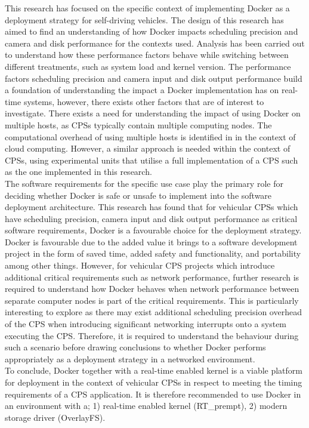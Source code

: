 This research has focused on the specific context of implementing Docker as a deployment strategy for self-driving vehicles. The design of this research has aimed to find an understanding of how Docker impacts scheduling precision and camera and disk performance for the contexts used. Analysis has been carried out to understand how these performance factors behave while switching between different treatments, such as system load and kernel version. The performance factors scheduling precision and camera input and disk output performance build a foundation of understanding the impact a Docker implementation has on real-time systems, however, there exists other factors that are of interest to investigate. There exists a need for understanding the impact of using Docker on multiple hosts, as CPSs typically contain multiple computing nodes. The computational overhead of using multiple hosts is identified in \cite{p1} in the context of cloud computing. However, a similar approach is needed within the context of CPSs, using experimental units that utilise a full implementation of a CPS such as the one implemented in this research.\\

The software requirements for the specific use case play the primary role for deciding whether Docker is safe or unsafe to implement into the software deployment architecture. This research has found that for vehicular CPSs which have scheduling precision, camera input and disk output performance as critical software requirements, Docker is a favourable choice for the deployment strategy. Docker is favourable due to the added value it brings to a software development project in the form of saved time, added safety and functionality, and portability among other things. However, for vehicular CPS projects which introduce additional critical requirements such as network performance, further research is required to understand how Docker behaves when network performance between separate computer nodes is part of the critical requirements. This is particularly interesting to explore as there may exist additional scheduling precision overhead of the CPS when introducing significant networking interrupts onto a system executing the CPS. Therefore, it is required to understand the behaviour during such a scenario before drawing conclusions to whether Docker performs appropriately as a deployment strategy in a networked environment.\\

To conclude, Docker together with a real-time enabled kernel is a viable platform for deployment in the context of vehicular CPSs in respect to meeting the timing requirements of a CPS application. It is therefore recommended to use Docker in an environment with a; 1) real-time enabled kernel (RT\_prempt), 2) modern storage driver (OverlayFS).